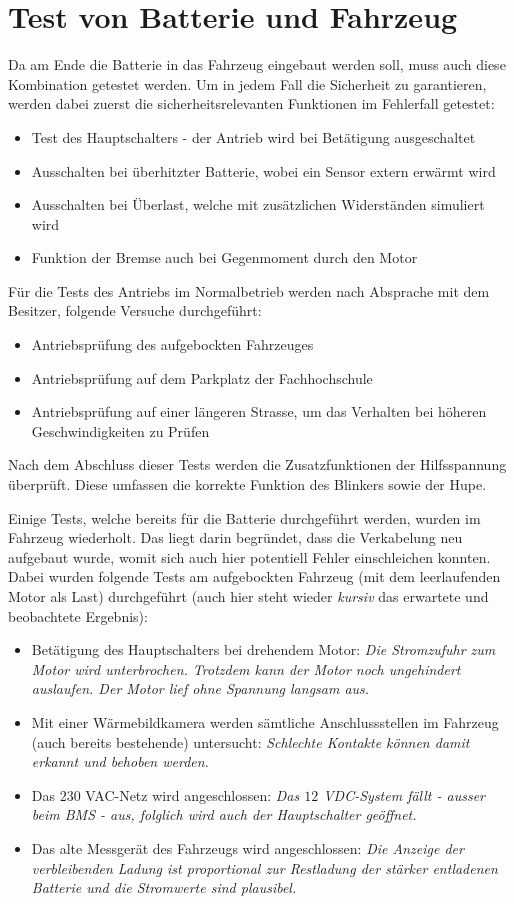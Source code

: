\section{Test von Batterie und Fahrzeug}
Da am Ende die Batterie in das Fahrzeug eingebaut werden soll, muss auch diese Kombination getestet werden. Um in jedem Fall die Sicherheit zu garantieren, werden dabei zuerst die sicherheitsrelevanten Funktionen im Fehlerfall getestet: \begin{itemize}
	\item Test des Hauptschalters - der Antrieb wird bei Betätigung ausgeschaltet
	\item Ausschalten bei überhitzter Batterie, wobei ein Sensor extern erwärmt wird
	\item Ausschalten bei Überlast, welche mit zusätzlichen Widerständen simuliert wird
	\item Funktion der Bremse auch bei Gegenmoment durch den Motor
\end{itemize}

Für die Tests des Antriebs im Normalbetrieb werden nach Absprache mit dem Besitzer, folgende Versuche durchgeführt: \begin{itemize}
	\item Antriebsprüfung des aufgebockten Fahrzeuges
	\item Antriebsprüfung auf dem Parkplatz der Fachhochschule
	\item Antriebsprüfung auf einer längeren Strasse, um das Verhalten bei höheren Geschwindigkeiten zu Prüfen
\end{itemize}

Nach dem Abschluss dieser Tests werden die Zusatzfunktionen der Hilfsspannung überprüft. Diese umfassen die korrekte Funktion des Blinkers sowie der Hupe.

\color{blue} Einige Tests, welche bereits für die Batterie durchgeführt werden, wurden im Fahrzeug wiederholt. Das liegt darin begründet, dass die Verkabelung neu aufgebaut wurde, womit sich auch hier potentiell Fehler einschleichen konnten. Dabei wurden folgende Tests am aufgebockten Fahrzeug (mit dem leerlaufenden Motor als Last) durchgeführt (auch hier steht wieder \textit{kursiv} das erwartete und beobachtete Ergebnis): \begin{itemize}
	\item Betätigung des Hauptschalters bei drehendem Motor: \textit{Die Stromzufuhr zum Motor wird unterbrochen. Trotzdem kann der Motor noch ungehindert auslaufen. Der Motor lief ohne Spannung langsam aus.}
	\item Mit einer Wärmebildkamera werden sämtliche Anschlussstellen im Fahrzeug (auch bereits bestehende) untersucht: \textit{Schlechte Kontakte können damit erkannt und behoben werden.}
	\item Das $230$ VAC-Netz wird angeschlossen: \textit{Das $12$ VDC-System fällt - ausser beim BMS - aus, folglich wird auch der Hauptschalter geöffnet.}
	\item Das alte Messgerät des Fahrzeugs wird angeschlossen: \textit{Die Anzeige der verbleibenden Ladung ist proportional zur Restladung der stärker entladenen Batterie und die Stromwerte sind plausibel.}
\end{itemize}

